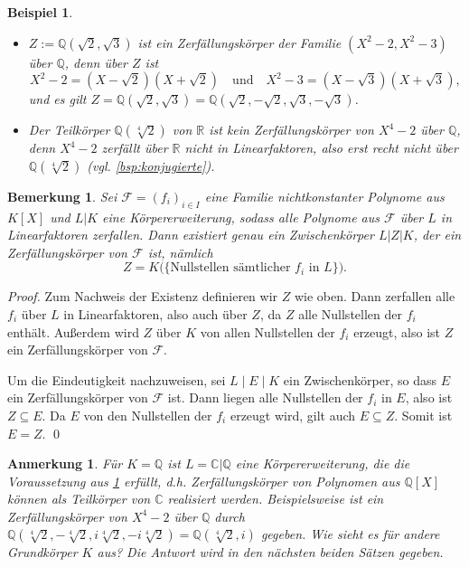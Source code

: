 \documentclass[a4paper, twoside, 11pt, ngerman]{report}
\newcommand{\CC}{\mathds C}
\newcommand{\QQ}{\mathds Q}
\newcommand{\RR}{\mathds R}
\newcommand{\calF}{\mathcal F}
\theoremstyle{definistyle}
\newtheorem{bem}[satz]{Bemerkung}
\newtheorem{anm}[satz]{Anmerkung}
\newtheorem{bsp}[satz]{Beispiel}
\theoremstyle{remark}
\begin{document}
\begin{bsp}\label{bsp:zerfall_koerper}
\begin{itemize}
    \item[(a)] $Z := \QQ(\sqrt{2}, \sqrt{3})$ ist ein Zerfällungskörper der Familie $(X^2-2, X^2-3)$ über $\QQ$, denn über $Z$ ist 
    \[
    X^2-2 = (X-\sqrt{2})(X+\sqrt{2}) \quad \text{und} \quad X^2-3 = (X-\sqrt{3})(X+\sqrt{3}),
    \]
    und es gilt $Z = \QQ(\sqrt{2}, \sqrt{3})=\QQ(\sqrt{2},-\sqrt{2},\sqrt{3},-\sqrt{3})$.
    \item[(b)] Der Teilkörper $\QQ(\sqrt[4]{2})$ von $\RR$ ist kein Zerfällungskörper von $X^4-2$ über $\QQ$, denn $X^4-2$ zerfällt über $\RR$ nicht in Linearfaktoren, also erst recht nicht über $\QQ(\sqrt[4]{2})$ (vgl. \ref{bsp:konjugierte}).
\end{itemize}
\end{bsp}

\begin{bem}\label{bem:realisierung_zerfall_koerper}
Sei $\calF=(f_i)_{i\in I}$ eine Familie nichtkonstanter Polynome aus $K[X]$ und $L|K$ eine Körpererweiterung, sodass alle Polynome aus $\calF$ über $L$ in Linearfaktoren zerfallen. Dann existiert genau ein Zwischenkörper $L|Z|K$, der ein Zerfällungskörper von $\calF$ ist, nämlich
\[
Z = K\big(\{\text{Nullstellen sämtlicher } f_i \text{ in } L\}\big).
\]
\end{bem}

\begin{proof}
Zum Nachweis der Existenz definieren wir $Z$ wie oben.  
Dann zerfallen alle $f_i$ über $L$ in Linearfaktoren, also auch über $Z$, da $Z$ alle Nullstellen der $f_i$ enthält. Außerdem wird $Z$ über $K$ von allen Nullstellen der $f_i$ erzeugt, also ist $Z$ ein Zerfällungskörper von $\calF$.

Um die Eindeutigkeit nachzuweisen, sei $L \mid E \mid K$ ein Zwischenkörper, so dass $E$ ein Zerfällungskörper von $\calF$ ist. Dann liegen alle Nullstellen der $f_i$ in $E$, also ist $Z \subseteq E$. Da $E$ von den Nullstellen der $f_i$ erzeugt wird, gilt auch $E \subseteq Z$. Somit ist $E = Z$.
\qed
\end{proof}

\begin{anm}\label{anm:zerfkoerper_realisiert_in_C}
Für $K = \QQ$ ist $L = \CC|\QQ$ eine Körpererweiterung, die die Voraussetzung aus \ref{bem:realisierung_zerfall_koerper} erfüllt, d.h. Zerfällungskörper von Polynomen aus $\QQ[X]$ können als Teilkörper von $\CC$ realisiert werden.  
Beispielsweise ist ein Zerfällungskörper von $X^4 - 2$ über $\QQ$ durch $\QQ(\sqrt[4]{2}, -\sqrt[4]{2}, i\sqrt[4]{2},-i\sqrt[4]{2}) = \QQ(\sqrt[4]{2}, i)$ gegeben. Wie sieht es für andere Grundkörper $K$ aus? Die Antwort wird in den nächsten beiden Sätzen gegeben.
\end{anm}
\end{document}
